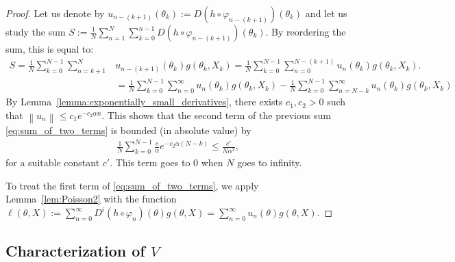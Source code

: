 \documentclass{article}
\newcommand\norm[1]{\left\|#1\right\|}
\begin{document}
\begin{proof}
    Let us denote by $u_{n-(k+1)}(\theta_k):=D(h\circ\varphi_{n-(k+1)})(\theta_{k})$ and let us study the sum $S := \frac1N\sum_{n=1}^N \sum_{k=0}^{n-1}D(h\circ\varphi_{n-(k+1)})(\theta_{k})$.  By reordering the sum, this is equal to:
    \begin{align}
        S = \frac1N \sum_{k=0}^{N-1} \sum_{n=k+1}^{N} &u_{n-(k+1)}(\theta_k)g(\theta_k,X_k) = \frac1N \sum_{k=0}^{N-1} \sum_{n=0}^{N-(k+1)} u_{n}(\theta_k)g(\theta_k,X_k).
        \nonumber\\
        &= \frac1N \sum_{k=0}^{N-1} \sum_{n=0}^{\infty} u_{n}(\theta_{k})g(\theta_k,X_k)
        - \frac1N \sum_{k=0}^{N-1} \sum_{n=N-k}^{\infty} u_{n}(\theta_{k})g(\theta_k,X_k)\label{eq:sum_of_two_terms}
    \end{align}
    By Lemma~\ref{lemma:exponentially_small_derivatives}, there exists $c_1,c_2>0$ such that $\norm{u_{n}}\le c_1e^{-c_2\alpha n}$. This shows that the second term of the previous sum \eqref{eq:sum_of_two_terms} is bounded (in absolute value) by 
    \begin{align}
        \frac1N\sum_{k=0}^{N-1} \frac{c}{\alpha} e^{-c_2\alpha(N-k)} \le \frac{c'}{N\alpha^2},\label{eq:sum_of_two_terms_bound1}
    \end{align}
    for a suitable constant $c'$.  This term goes to $0$ when $N$ goes to infinity.

    To treat the first term of \eqref{eq:sum_of_two_terms}, we apply Lemma~\ref{lem:Poisson2} with the function $\ell(\theta,X):=\sum_{n=0}^\infty D^i(h \circ \varphi_{n})(\theta) g(\theta,X)=\sum_{n=0}^\infty u_{n}(\theta)g(\theta,X)$. 
\end{proof}

\subsection{Characterization of $V$}
\label{ssec:computable}
\end{document}
